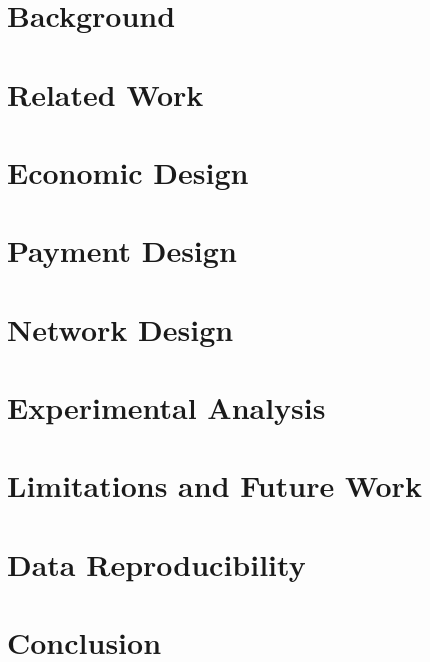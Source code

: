 \documentclass[sigconf, anonymous]{acmart}
\begin{document}
\section{Background}
\label{sec:background}


\section{Related Work}
\label{sec:related_work}


\section{Economic Design}
\label{sec:economic}


\section{Payment Design}
\label{sec:payment}


\section{Network Design}
\label{sec:network}


\section{Experimental Analysis}
\label{sec:analysis}


\section{Limitations and Future Work}
\label{sec:limitations_futurework}


\section{Data Reproducibility}
\label{sec:code}


\section{Conclusion}
\label{sec:conclusion}


\end{document}

